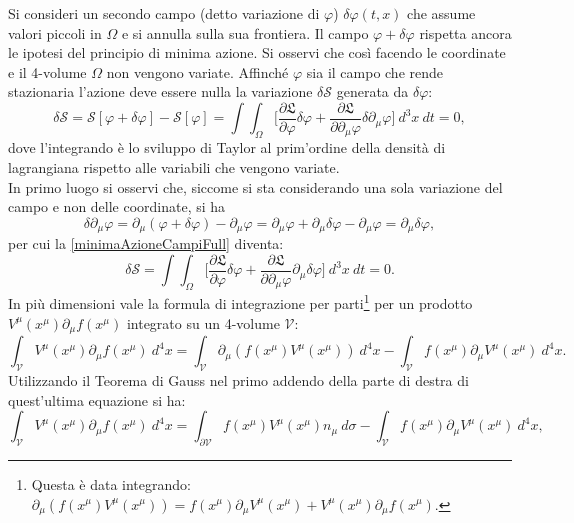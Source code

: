  Si consideri un secondo campo (detto variazione di $\varphi$) $\delta\varphi(t,x)$ che assume valori piccoli in $\Omega$ e si annulla sulla sua frontiera. Il campo $\varphi+\delta\varphi$ rispetta ancora le ipotesi del principio di minima azione. Si osservi che così facendo le coordinate e il 4-volume $\Omega$ non vengono variate. Affinché $\varphi$ sia il campo che rende stazionaria l'azione deve essere nulla la variazione $\delta\mathcal{S}$ generata da $\delta\varphi$:
\begin{equation}
    \delta\mathcal{S}=\mathcal{S}[\varphi+\delta\varphi]-\mathcal{S}[\varphi]=\int\int_{\Omega}\bigg[\frac{\partial\mathfrak{L}}{\partial \varphi}\delta\varphi+\frac{\partial\mathfrak{L}}{\partial \partial_\mu\varphi}\delta\partial_\mu\varphi\bigg]\ d^3x\ dt=0,\label{minimaAzioneCampiFull}
\end{equation}
dove l'integrando è lo sviluppo di Taylor al prim'ordine della densità di lagrangiana rispetto alle variabili che vengono variate.\\
In primo luogo si osservi che, siccome si sta considerando una sola variazione del campo e non delle coordinate, si ha
\begin{equation*}
    \delta\partial_\mu\varphi=\partial_\mu(\varphi+\delta\varphi)-\partial_\mu\varphi=\partial_\mu\varphi+\partial_\mu\delta\varphi-\partial_\mu\varphi=\partial_\mu\delta\varphi,
\end{equation*}
per cui la \eqref{minimaAzioneCampiFull} diventa:
\begin{equation}
    \delta\mathcal{S}=\int\int_{\Omega}\bigg[\frac{\partial\mathfrak{L}}{\partial \varphi}\delta\varphi+\frac{\partial\mathfrak{L}}{\partial \partial_\mu\varphi}\partial_\mu\delta\varphi\bigg]\ d^3x\ dt=0.\label{minimaAzioneCampiFull'}
\end{equation}
In più dimensioni vale la formula di integrazione per parti\footnote{Questa è data integrando: $\partial_\mu(f(x^\mu)V^\mu(x^\mu))=f(x^\mu)\partial_\mu V^\mu(x^\mu)+V^\mu(x^\mu)\partial_\mu f(x^\mu)$.} per un prodotto $V^\mu(x^\mu)\partial_\mu f(x^\mu) $ integrato su un 4-volume $\mathcal{V}$:
\begin{equation*}
    \int_{\mathcal{V} }V^\mu(x^\mu)\partial_\mu f(x^\mu)\ d^4x=\int_{\mathcal{V} }\partial_\mu(f(x^\mu)V^\mu(x^\mu))\ d^4x-\int_{\mathcal{V} }f(x^\mu)\partial_\mu V^\mu(x^\mu)\ d^4x.
\end{equation*}
Utilizzando il Teorema di Gauss nel primo addendo della parte di destra di quest'ultima equazione si ha:
\begin{equation*}
\int_{\mathcal{V} }V^\mu(x^\mu)\partial_\mu f(x^\mu)\ d^4x=\int_{\partial\mathcal{V} }f(x^\mu)V^\mu(x^\mu)n_\mu\ d\sigma-    \int_{\mathcal{V} }f(x^\mu)\partial_\mu V^\mu(x^\mu)\ d^4x,
\end{equation*}
